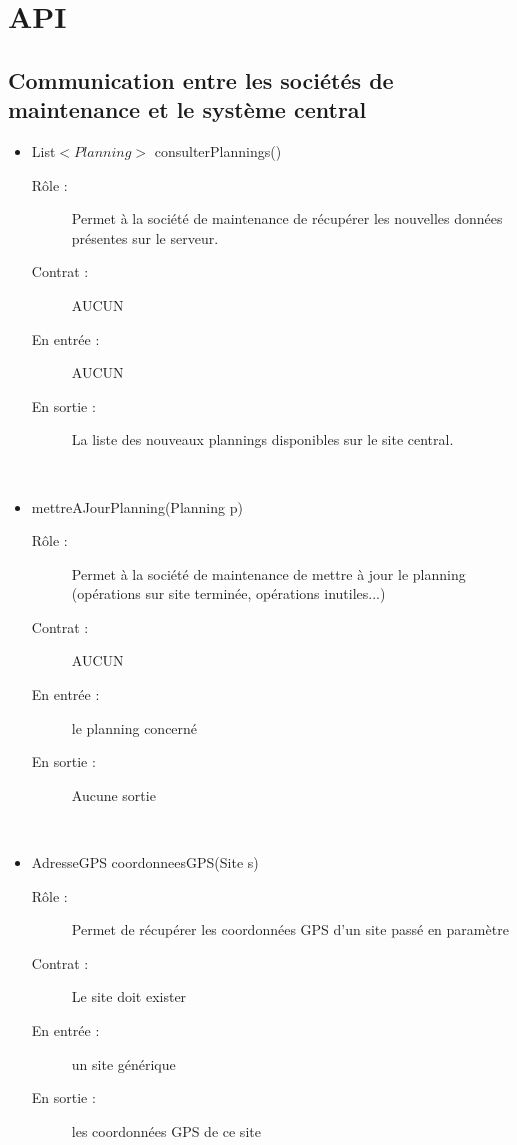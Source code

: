 \section{API}

\subsection{Communication entre les sociétés de maintenance et le système central}
\begin{itemize}
	\item List$<Planning>$ consulterPlannings()
	\begin{description} 
		\item[Rôle :] Permet à la société de maintenance de récupérer les nouvelles données présentes sur le serveur.
		\item[Contrat :] AUCUN
		\item[En entrée :] AUCUN
		\item[En sortie :] La liste des nouveaux plannings disponibles sur le site central.
	\end{description}
	~\\
	\item mettreAJourPlanning(Planning p)
	\begin{description} 
		\item[Rôle :] Permet à la société de maintenance de mettre à jour le planning (opérations sur site terminée, opérations inutiles...)
		\item[Contrat :] AUCUN
		\item[En entrée :] le planning concerné 
		\item[En sortie :] Aucune sortie
	\end{description}
	~\\
	\item AdresseGPS coordonneesGPS(Site s)
	\begin{description} 
		\item[Rôle :] Permet de récupérer les coordonnées GPS d'un site passé en paramètre
		\item[Contrat :] Le site doit exister
		\item[En entrée :] un site générique
		\item[En sortie :] les coordonnées GPS de ce site
	\end{description}
	~\\

\end{itemize}

